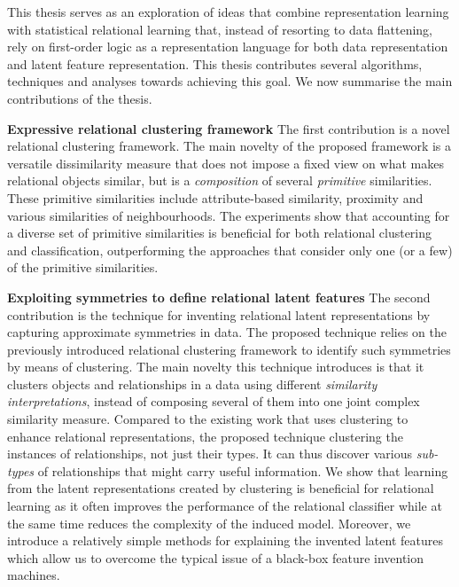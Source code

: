 This thesis serves as an exploration of ideas that combine representation learning with statistical relational learning that, instead of resorting to data flattening, rely on first-order logic as a representation language for both data representation and latent feature representation.
This thesis contributes several algorithms, techniques and analyses towards achieving this goal.
We now summarise the main contributions of the thesis.


\textbf{Expressive relational clustering framework}
The first contribution is a novel relational clustering framework.
The main novelty of the proposed framework is a versatile dissimilarity measure that does not impose a fixed view on what makes relational objects similar, but is a \textit{composition} of several \textit{primitive} similarities.
These primitive similarities include attribute-based similarity, proximity and various similarities of neighbourhoods.
The experiments show that accounting for a diverse set of primitive similarities is beneficial for both relational clustering and classification, outperforming the  approaches that  consider only one (or a few) of the primitive similarities.


\textbf{Exploiting symmetries to define relational latent features}
The second contribution is the technique for inventing relational latent representations by capturing approximate symmetries in data.
The proposed technique relies on the previously introduced relational clustering framework to identify such symmetries by means of clustering.
The main novelty this technique introduces is that it clusters objects and relationships in a data using different \textit{similarity interpretations}, instead of composing several of them into one joint complex similarity measure.
Compared to the existing work that uses clustering to enhance relational representations, the proposed technique clustering the instances of relationships, not just their types.
It can thus discover various \textit{sub-types} of relationships that might carry useful information.
We show that learning from the latent representations created by clustering is beneficial for relational learning as it often improves the performance of the relational classifier while at the same time reduces the complexity of the induced model.
Moreover, we introduce a relatively simple methods for explaining the invented latent features which allow us to overcome the typical issue of a black-box feature invention machines.



